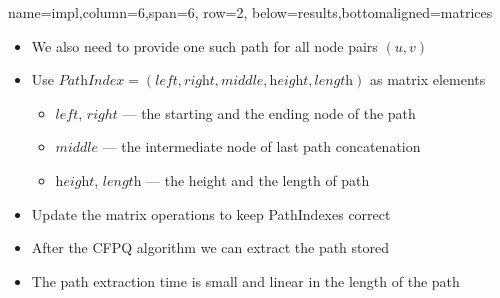 \documentclass[a0paper,portrait]{baposter}
\begin{document}
\begin{poster}


{name=impl,column=6,span=6, row=2, below=results,bottomaligned=matrices}
{
\begin{itemize}
	\item We also need to provide one such path for all node pairs $(u,v)$
	\item Use $\textit{PathIndex} = (\textit{left},\textit{right},\textit{middle},\textit{height},\textit{length})$ as matrix elements
	\begin{itemize}
		\item $left$, $right$ --- the starting and the ending node of the path
		\item $middle$ --- the intermediate node of last path concatenation
		\item $\textit{height}$, $\textit{length}$ --- the height and the length of path			
	\end{itemize}
    \item Update the matrix operations to keep PathIndexes correct
    \item After the CFPQ algorithm we can extract the path stored
    \item The path extraction time is small and linear in the length of the path
\end{itemize}
}


\end{poster}
\end{document}
